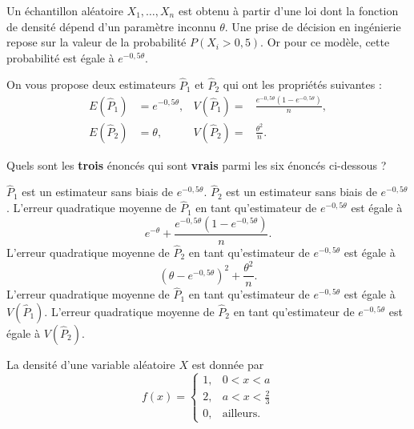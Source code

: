\begin{questions}
 \pageblanche

\question[6]\label{AOVblocs1} 

Un échantillon aléatoire $X_1,\dots,X_n$ est obtenu à partir d'une loi dont la fonction
de densité dépend d'un paramètre inconnu $\theta$. Une prise de décision en ingénierie
repose sur la valeur de la probabilité $P(X_i>0,5)$. Or pour ce modèle, 
cette probabilité est égale à $e^{-0,5\theta}$.

On vous propose deux estimateurs $\hat{P}_1$ et $\hat{P}_2$ qui ont les propriétés suivantes :
\begin{align*}
    E(\hat{P}_1)&= e^{-0,5\theta},&  V(\hat{P}_1) =& \frac{e^{-0,5\theta}\left(1-e^{-0,5\theta}\right)}{n}, \\
    E(\hat{P}_2) &= \theta,&  V(\hat{P}_2) =&\frac{\theta^2}{n} .
\end{align*}

Quels sont les \textbf{trois} énoncés qui sont \textbf{vrais} parmi les six énoncés ci-dessous ?

\begin{checkboxes}
    \correctchoice $\hat{P}_1$ est un estimateur sans biais de $e^{-0,5\theta}$.
    \vspace{0.5cm}
\choice $\hat{P}_2$ est un estimateur sans biais de $e^{-0,5\theta}$.
\vspace{0.5cm}
\choice L'erreur quadratique moyenne de $\hat{P}_1$ en tant qu'estimateur de $e^{-0,5\theta}$ est égale à 
$$e^{-\theta}+\frac{e^{-0,5\theta}\left(1-e^{-0,5\theta}\right)}{n}.$$
    \correctchoice L'erreur quadratique moyenne de $\hat{P}_2$ en tant qu'estimateur de $e^{-0,5\theta}$
est égale à 
$$\left(\theta-e^{-0,5\theta}\right)^2+\frac{\theta^2}{n}.$$
\correctchoice L'erreur quadratique moyenne de $\hat{P}_1$ en tant qu'estimateur de $e^{-0,5\theta}$ est égale à 
$V(\hat{P}_1)$.
\vspace{0.5cm}
\choice L'erreur quadratique moyenne de $\hat{P}_2$ en tant qu'estimateur de $e^{-0,5\theta}$ est égale à 
$V(\hat{P}_2)$.
\end{checkboxes}


\pageblanche




\question[4]\label{2moyregle}

La densité d'une variable aléatoire $X$ est donnée par
$$f(x)=\left\{\begin{array}{ll}
1, & 0<x<a \\ 2, & a<x<\frac{2}{3} \\ 0, &  \text{ailleurs.}
\end{array}\right.$$



\end{questions}
